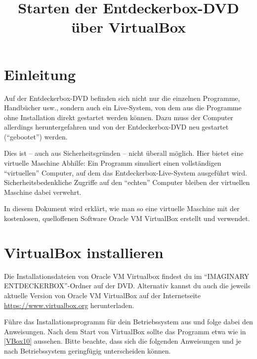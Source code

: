 \documentclass[a4paper,10pt,BCOR=0mm,DIV=14]{scrartcl}
\title{Starten der Entdeckerbox-DVD über VirtualBox}
\newcommand{\command}[1]{\textsf{\enquote{#1}}}
\begin{document}
\maketitle

\section{Einleitung}
Auf der Entdeckerbox-DVD befinden sich nicht nur die einzelnen Programme, Handbücher usw., sondern auch ein Live-System, von dem aus die Programme ohne Installation direkt gestartet werden können. Dazu muss der Computer allerdings heruntergefahren und von der Entdeckerbox-DVD neu gestartet (\enquote{gebootet}) werden.

Dies ist -- auch aus Sicherheitsgründen -- nicht überall möglich. Hier bietet eine virtuelle Maschine Abhilfe: Ein Programm simuliert einen vollständigen \enquote{virtuellen} Computer, auf dem das Entdeckerbox-Live-System ausgeführt wird. Sicherheitsbedenkliche Zugriffe auf den \enquote{echten} Computer bleiben der virtuellen Maschine dabei verwehrt.

In diesem Dokument wird erklärt, wie man so eine virtuelle Maschine mit der kostenlosen, quelloffenen Software Oracle VM VirtualBox erstellt und verwendet.



\section{VirtualBox installieren}
Die Installationsdateien von Oracle VM Virtualbox findest du im \command{IMAGINARY ENTDECKERBOX}-Ordner auf der DVD. Alternativ kannst du auch die jeweils aktuelle Version von Oracle VM VirtualBox auf der Internetseite \url{https://www.virtualbox.org} herunterladen.

Führe das Installationsprogramm für dein Betriebssystem aus und folge dabei den Anweisungen. Nach dem Start von VirtualBox sollte das Programm etwa wie in \cref{VBox10} aussehen. Bitte beachte, dass sich die folgenden Anweisungen und  je nach Betriebssystem geringfügig unterscheiden können.
\end{document}
